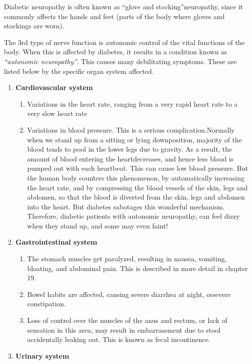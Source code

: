 Diabetic neuropathy is often known as “glove and stocking”\break neuropathy, since it commonly affects the hands and feet (parts of the body where gloves and stockings are worn).

The 3rd type of nerve function is autonomic control of the vital functions of the body. When this is affected by diabetes, it results in a condition known as \textit{“autonomic neuropathy”}. This causes many debilitating symptoms. These are listed below by the specific organ system affected.
\begin{enumerate}[•]
\itemsep=0pt
\item \textbf{Cardiovascular system}
\begin{enumerate}[o]
\itemsep=0pt
\item Variations in the heart rate, ranging from a very rapid heart rate to a very slow heart rate
\item Variations in blood pressure. This is a serious complication.\break Normally when we stand up from a sitting or lying down\break position, majority of the blood tends to pool in the lower legs due to gra\-vity. As a result, the amount of blood entering the heart\break decreases, and hence less blood is pumped out with each heartbeat. This can cause low blood pressure. But the human body counters this pheno\-menon, by automatically increasing the heart rate, and by compressing the blood vessels of the skin, legs and abdomen, so that the blood is diverted from the skin, legs and abdomen into the heart. But diabetes sabotages this wonderful mechanism. Therefore, diabetic patients with autonomic neuro\-pathy, can feel dizzy when they stand up, and some may even faint!
\end{enumerate}
\item \textbf{Gastrointestinal system}
\begin{enumerate}[o]
\itemsep=0pt
\item The stomach muscles get paralyzed, resulting in nausea, vomiting, bloating, and abdominal pain. This is described in more detail in chapter 19.
\item Bowel habits are affected, causing severe diarrhea at night, or\break severe constipation.
\item Loss of control over the muscles of the anus and rectum, or lack of sensation in this area, may result in embarrassment due to stool accidentally leaking out. This is known as fecal incontinence.
\end{enumerate}
\item \textbf{Urinary system}

\end{enumerate}
